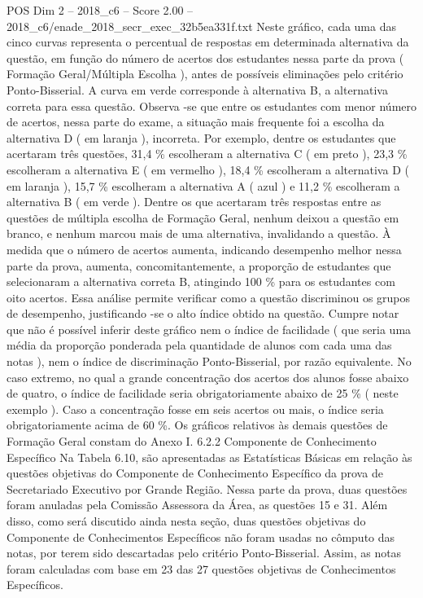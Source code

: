 \begin{textsample}{POS Dim 2 – 2018\_c6 – Score 2.00 – 2018\_c6/enade\_2018\_secr\_exec\_32b5ea331f.txt}
Neste gráfico, cada uma das cinco curvas representa o percentual de respostas em determinada alternativa da questão, em função do número de acertos dos estudantes nessa parte da prova ( Formação Geral/Múltipla Escolha ), antes de possíveis eliminações pelo critério Ponto-Bisserial.
A curva em verde corresponde à alternativa B, a alternativa correta para essa questão.
Observa -se que entre os estudantes com menor número de acertos, nessa parte do exame, a situação mais frequente foi a escolha da alternativa D ( em laranja ), incorreta.
Por exemplo, dentre os estudantes que acertaram três questões, 31,4 \% escolheram a alternativa C ( em preto ), 23,3 \% escolheram a alternativa E ( em vermelho ), 18,4 \% escolheram a alternativa D ( em laranja ), 15,7 \% escolheram a alternativa A ( azul ) e 11,2 \% escolheram a alternativa B ( em verde ).
Dentre os que acertaram três respostas entre as questões de múltipla escolha de Formação Geral, nenhum deixou a questão em branco, e nenhum marcou mais de uma alternativa, invalidando a questão.
À medida que o número de acertos aumenta, indicando desempenho melhor nessa parte da prova, aumenta, concomitantemente, a proporção de estudantes que selecionaram a alternativa correta B, atingindo 100 \% para os estudantes com oito acertos.
Essa análise permite verificar como a questão discriminou os grupos de desempenho, justificando -se o alto índice obtido na questão.
Cumpre notar que não é possível inferir deste gráfico nem o índice de facilidade ( que seria uma média da proporção ponderada pela quantidade de alunos com cada uma das notas ), nem o índice de discriminação Ponto-Bisserial, por razão equivalente.
No caso extremo, no qual a grande concentração dos acertos dos alunos fosse abaixo de quatro, o índice de facilidade seria obrigatoriamente abaixo de 25 \% ( neste exemplo ).
Caso a concentração fosse em seis acertos ou mais, o índice seria obrigatoriamente acima de 60 \%.
Os gráficos relativos às demais questões de Formação Geral constam do Anexo I. 6.2.2 Componente de Conhecimento Específico Na Tabela 6.10, são apresentadas as Estatísticas Básicas em relação às questões objetivas do Componente de Conhecimento Específico da prova de Secretariado Executivo por Grande Região.
Nessa parte da prova, duas questões foram anuladas pela Comissão Assessora da Área, as questões 15 e 31.
Além disso, como será discutido ainda nesta seção, duas questões objetivas do Componente de Conhecimentos Específicos não foram usadas no cômputo das notas, por terem sido descartadas pelo critério Ponto-Bisserial.
Assim, as notas foram calculadas com base em 23 das 27 questões objetivas de Conhecimentos Específicos.

\end{textsample}

